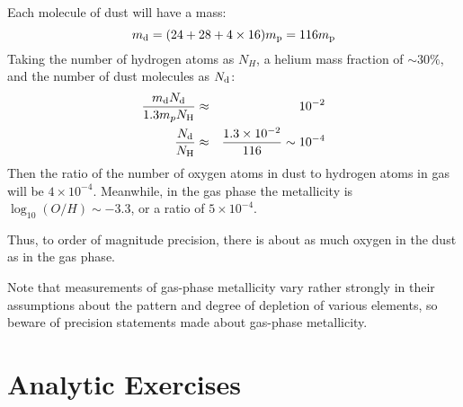 \begin{enumerate}
\begin{answer}
Each molecule of dust will have a mass:
\begin{equation}
 m_{\rm d} = (24 + 28 + 4 \times 16) m_{\rm p} = 116 m_{\rm p}
\end{equation}
Taking the number of hydrogen atoms as $N_H$, a helium mass fraction
of $\sim 30\%$, and the number of dust molecules as $N_{\rm d}$:
\begin{eqnarray}
\frac{m_{\rm d} N_{\rm d}}{1.3 m_p N_{\rm H}} &\approx& 10^{-2} \cr
\frac{N_{\rm d}}{N_{\rm H}} &\approx& \frac{1.3 \times
10^{-2}}{116} \sim 10^{-4}
\end{eqnarray}
Then the ratio of the number of oxygen atoms in dust to hydrogen atoms
in gas will be $4\times 10^{-4}$. Meanwhile, in the gas phase the
metallicity is $\log_{10} (O/H) \sim -3.3$, or a ratio of $5\times
10^{-4}$.

Thus, to order of magnitude precision, there is about as much oxygen
in the dust as in the gas phase. 

Note that measurements of gas-phase metallicity vary rather strongly
in their assumptions about the pattern and degree of depletion of
various elements, so beware of precision statements made about
gas-phase metallicity.
\end{answer}
\end{enumerate}   

\section{Analytic Exercises}

